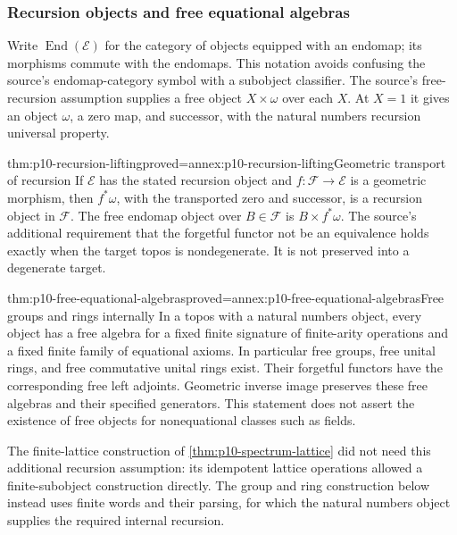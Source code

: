 \subsubsection{Recursion objects and free equational algebras}
\label{sec:p10-recursion-free-algebras}

Write \(\operatorname{End}(\mathcal E)\) for the category of
objects equipped with an endomap; its morphisms commute with
the endomaps. This notation avoids confusing the source's
endomap-category symbol with a subobject classifier.
The source's free-recursion assumption supplies a free object
\(X\times\omega\) over each \(X\).
At \(X=1\) it gives an object \(\omega\), a zero map, and successor,
with the natural numbers recursion universal property.

\begin{hbtheorem}{thm:p10-recursion-lifting}{proved=annex:p10-recursion-lifting}{Geometric transport of recursion}
If \(\mathcal E\) has the stated recursion object and
\(f:\mathcal F\to\mathcal E\) is a geometric morphism, then
\(f^*\omega\), with the transported zero and successor,
is a recursion object in \(\mathcal F\).
The free endomap object over \(B\in\mathcal F\) is
\(B\times f^*\omega\).
The source's additional requirement that the forgetful functor
not be an equivalence holds exactly when the target topos is
nondegenerate. It is not preserved into a degenerate target.
\end{hbtheorem}

\begin{hbtheorem}{thm:p10-free-equational-algebras}{proved=annex:p10-free-equational-algebras}{Free groups and rings internally}
In a topos with a natural numbers object, every object has a free
algebra for a fixed finite signature of finite-arity operations
and a fixed finite family of equational axioms.
In particular free groups, free unital rings, and free
commutative unital rings exist.
Their forgetful functors have the corresponding free left adjoints.
Geometric inverse image preserves these free algebras and their
specified generators.
This statement does not assert the existence of free objects for
nonequational classes such as fields.
\end{hbtheorem}

The finite-lattice construction of
\cref{thm:p10-spectrum-lattice} did not need this additional
recursion assumption: its idempotent lattice operations allowed
a finite-subobject construction directly. The group and ring
construction below instead uses finite words and their parsing,
for which the natural numbers object supplies the required
internal recursion.

